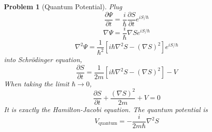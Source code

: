 \documentclass{article}
\theoremstyle{t}
\newtheorem{problem}{Problem}
\newcommand{\pa}{\partial}
\begin{document}
\begin{problem}[Quantum Potential]
    Plug
    \begin{equation}
        \frac{\pa \Psi}{\pa t}=\frac{i}{\hbar}\frac{\pa S}{\pa t}e^{iS/\hbar}
    \end{equation}
    \begin{equation}
        \nabla \Psi=\frac{i}{\hbar} \nabla S e^{iS/\hbar}
    \end{equation}
    \begin{equation}
        \nabla^2 \Psi=\frac{1}{\hbar^2}\left[i\hbar \nabla^2 S-\left(\nabla S\right)^2\right]e^{iS/\hbar}
    \end{equation}
    into Schrödinger equation,
    \begin{equation}
        \frac{\pa S}{\pa t}=\frac{1}{2m}\left[i\hbar \nabla^2 S-\left(\nabla S\right)^2\right]-V
    \end{equation}
    When taking the limit $\hbar\rightarrow 0$,
    \begin{equation}
        \frac{\pa S}{\pa t}+\frac{\left(\nabla S\right)^2 }{2m}+V=0
    \end{equation}
    It is exactly the Hamilton-Jacobi equation. The quantum potential is 
    \begin{equation}
        \boxed{V_{\text{quantum}}=-\frac{i}{2m\hbar}\nabla^2S}
    \end{equation}
\end{problem}
\end{document}
